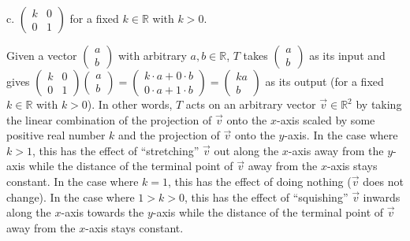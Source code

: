 \documentclass[12pt]{article}
\newenvironment{problem}[2][Problem]
{
	\begin{trivlist} 
		\item[\hskip \labelsep {\bfseries #1 #2:}]
	}
{
	\end{trivlist}
	}
\newenvironment{solution}[1][Solution]
{
	\begin{trivlist} 
		\item[\hskip \labelsep {\itshape #1:}]
	}
	{
	\end{trivlist}
}
\begin{document}
\begin{problem}{4}
\noindent
\newline
\newline
c. $\begin{pmatrix}k&0\\0&1\end{pmatrix}$ for a fixed $k \in \mathbb{R}$ with $k>0$.
\begin{solution}
Given a vector $\begin{pmatrix}a\\b\end{pmatrix}$ with arbitrary $a,b \in \mathbb{R}$, $T$ takes $\begin{pmatrix}a\\b\end{pmatrix}$ as its input and gives $\begin{pmatrix}k&0\\0 & 1\end{pmatrix} \begin{pmatrix}a\\b\end{pmatrix}=\begin{pmatrix}k\cdot a+ 0\cdot b\\0\cdot a+1\cdot b\end{pmatrix} = \begin{pmatrix}ka\\b\end{pmatrix}$ as its output (for a fixed $k \in \mathbb{R}$ with $k>0$). In other words, $T$ acts on an arbitrary vector $\vec{v} \in \mathbb{R}^2$ by taking the linear combination of the projection of $\vec{v}$ onto the $x$-axis scaled by some positive real number $k$ and the projection of $\vec{v}$ onto the $y$-axis. In the case where $k>1$,  this has the effect of ``stretching'' $\vec{v}$ out along the $x$-axis away from the $y$-axis while the distance of the terminal point of $\vec{v}$ away from the $x$-axis stays constant. In the case where $k=1$, this has the effect of doing nothing ($\vec{v}$ does not change). In the case where $1>k>0$, this has the effect of ``squishing'' $\vec{v}$ inwards along the $x$-axis towards the $y$-axis while the distance of the terminal point of $\vec{v}$ away from the $x$-axis stays constant.
\end{solution}

\end{problem}
\end{document}
